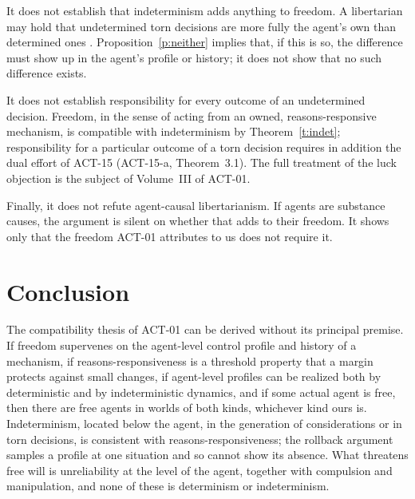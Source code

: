 \documentclass{situationist-preprint}
\begin{document}
It does not establish that indeterminism adds anything to freedom. A libertarian may hold that undetermined torn decisions are more fully the agent's own than determined ones \citep{Kane1996,Balaguer2010}. Proposition~\ref{p:neither} implies that, if this is so, the difference must show up in the agent's profile or history; it does not show that no such difference exists.

It does not establish responsibility for every outcome of an undetermined decision. Freedom, in the sense of acting from an owned, reasons-responsive mechanism, is compatible with indeterminism by Theorem~\ref{t:indet}; responsibility for a particular outcome of a torn decision requires in addition the dual effort of ACT-15 (ACT-15-a, Theorem~3.1). The full treatment of the luck objection is the subject of Volume~III of ACT-01.

Finally, it does not refute agent-causal libertarianism. If agents are substance causes, the argument is silent on whether that adds to their freedom. It shows only that the freedom ACT-01 attributes to us does not require it.

\section{Conclusion}\label{s:concl}

The compatibility thesis of ACT-01 can be derived without its principal premise. If freedom supervenes on the agent-level control profile and history of a mechanism, if reasons-responsiveness is a threshold property that a margin protects against small changes, if agent-level profiles can be realized both by deterministic and by indeterministic dynamics, and if some actual agent is free, then there are free agents in worlds of both kinds, whichever kind ours is. Indeterminism, located below the agent, in the generation of considerations or in torn decisions, is consistent with reasons-responsiveness; the rollback argument samples a profile at one situation and so cannot show its absence. What threatens free will is unreliability at the level of the agent, together with compulsion and manipulation, and none of these is determinism or indeterminism.
\end{document}
